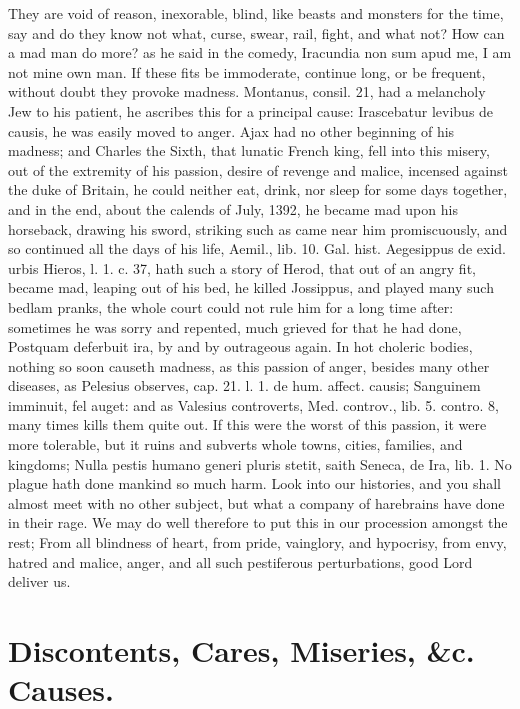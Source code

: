 {They are void of reason, inexorable, blind, like beasts and monsters
for the time, say and do they know not what, curse, swear, rail, fight,
and what not? How can a mad man do more? as he said in the comedy,
 Iracundia non sum apud me, I am not mine own man. If these fits
be immoderate, continue long, or be frequent, without doubt they
provoke madness. Montanus, consil. 21, had a melancholy Jew to his
patient, he ascribes this for a principal cause: Irascebatur levibus de
causis, he was easily moved to anger. Ajax had no other beginning of
his madness; and Charles the Sixth, that lunatic French king, fell into
this misery, out of the extremity of his passion, desire of revenge and
malice, incensed against the duke of Britain, he could neither
eat, drink, nor sleep for some days together, and in the end, about the
calends of July, 1392, he became mad upon his horseback, drawing his
sword, striking such as came near him promiscuously, and so continued
all the days of his life, Aemil., lib. 10. Gal. hist. Aegesippus de
exid. urbis Hieros, l. 1. c. 37, hath such a story of Herod, that out
of an angry fit, became mad, leaping out of his bed, he killed
Jossippus, and played many such bedlam pranks, the whole court could
not rule him for a long time after: sometimes he was sorry and
repented, much grieved for that he had done, Postquam deferbuit ira, by
and by outrageous again. In hot choleric bodies, nothing so soon
causeth madness, as this passion of anger, besides many other diseases,
as Pelesius observes, cap. 21. l. 1. de hum. affect. causis; Sanguinem
imminuit, fel auget: and as Valesius controverts, Med. controv.,
lib. 5. contro. 8, many times kills them quite out. If this were the
worst of this passion, it were more tolerable, but it ruins and
subverts whole towns, cities, families, and kingdoms; Nulla
pestis humano generi pluris stetit, saith Seneca, de Ira, lib. 1. No
plague hath done mankind so much harm. Look into our histories, and you
shall almost meet with no other subject, but what a company of
harebrains have done in their rage. We may do well therefore to put
this in our procession amongst the rest; From all blindness of heart,
from pride, vainglory, and hypocrisy, from envy, hatred and malice,
anger, and all such pestiferous perturbations, good Lord deliver us.

\section{Discontents, Cares, Miseries, \&c. Causes.}

}
